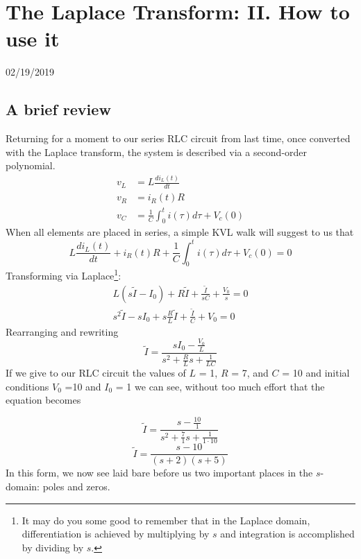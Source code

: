 \documentclass[11pt]{book}
\begin{document}
\chapter{The Laplace Transform: II. How to use it}
02/19/2019
\minitoc
\newpage

\section{A brief review}
Returning for a moment to our series RLC circuit from last time, once converted with the Laplace transform, the system is described via a second-order polynomial. 
\begin{align}
	v_L &= L\frac{di_L(t)}{dt} \\
	v_R &= i_R(t)R \\
	v_C & = \frac{1}{C}\int_0^t i(\tau)d\tau + V_c(0)
\end{align}
When all elements are placed in series, a simple KVL walk will suggest to us that
\begin{equation}
	L\frac{di_L(t)}{dt} + i_R(t)R + \frac{1}{C}\int_0^t i(\tau)d\tau + V_c(0) = 0
\end{equation}
Transforming via Laplace\footnote{It may do you some good to remember that in the Laplace domain, differentiation is achieved by multiplying by $s$ and integration is accomplished by dividing by $s$.}:
\begin{eqnarray}
	L(s\tilde{I} - I_0) + R\tilde{I} + \frac{\tilde{I}}{sC} + \frac{V_0}{s} = 0 \\
	s^2\tilde{I} - sI_0 + s\frac{R}{L}\tilde{I} + \frac{\tilde{I}}{C} + V_0 = 0 
\end{eqnarray}
Rearranging and rewriting
\begin{equation}
	\tilde{I} = \frac{sI_0 - \frac{V_0}{L}}{s^2 + \frac{R}{L}s + \frac{1}{LC}}
\end{equation}
If we give to our RLC circuit the values of $L$ = 1, $R$ = 7, and $C$ = 10 and initial conditions $V_0$ =10 and $I_0$ = 1 we can see, without too much effort that the equation becomes

\begin{equation}
	\tilde{I} = \frac{s - \frac{10}{1}}{s^2 + \frac{7}{1}s + \frac{1}{1 \cdot 10}}
\end{equation}
\begin{equation}
	\tilde{I} = \frac{s - 10}{(s+2)(s+5)}
\end{equation}
In this form, we now see laid bare before us two important places in the $s$-domain: poles and zeros.
\end{document}
